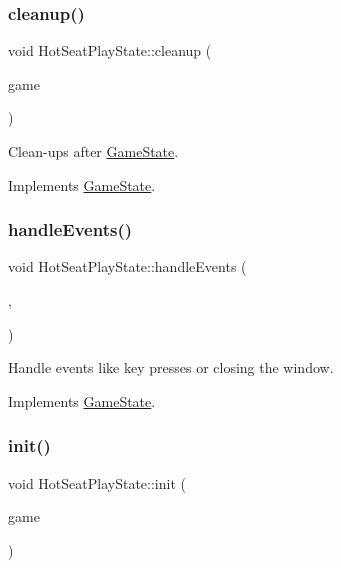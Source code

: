 \subsubsection{\texorpdfstring{cleanup()}{cleanup()}}
{\footnotesize\ttfamily void Hot\+Seat\+Play\+State\+::cleanup (\begin{DoxyParamCaption}\item[{\mbox{\hyperlink{class_game_engine}{Game\+Engine}} $\ast$}]{game }\end{DoxyParamCaption})\hspace{0.3cm}{\ttfamily [virtual]}}



Clean-\/ups after \mbox{\hyperlink{class_game_state}{Game\+State}}. 



Implements \mbox{\hyperlink{class_game_state_a7df4ea0b4815d2b3b35dbec2a399a0b6}{Game\+State}}.

\mbox{\label{class_hot_seat_play_state_a92606c5f4b8106b4fec1482a75be3c8d}} 
\subsubsection{\texorpdfstring{handleEvents()}{handleEvents()}}
{\footnotesize\ttfamily void Hot\+Seat\+Play\+State\+::handle\+Events (\begin{DoxyParamCaption}\item[{\mbox{\hyperlink{class_game_engine}{Game\+Engine}} $\ast$}]{,  }\item[{sf\+::\+Event}]{ }\end{DoxyParamCaption})\hspace{0.3cm}{\ttfamily [virtual]}}



Handle events like key presses or closing the window. 



Implements \mbox{\hyperlink{class_game_state_a3ef0638514dbfe71581d593cf0f66ce5}{Game\+State}}.

\mbox{\label{class_hot_seat_play_state_a2d1a6b35aac53c988e7b036d89794e70}} 
\subsubsection{\texorpdfstring{init()}{init()}}
{\footnotesize\ttfamily void Hot\+Seat\+Play\+State\+::init (\begin{DoxyParamCaption}\item[{\mbox{\hyperlink{class_game_engine}{Game\+Engine}} $\ast$}]{game }\end{DoxyParamCaption})\hspace{0.3cm}{\ttfamily [virtual]}}




